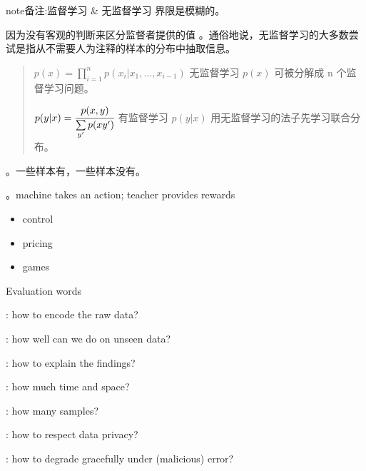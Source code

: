 \documentclass[letterpaper,10pt,english]{sphinxmanual}
\begin{document}
\begin{sphinxadmonition}{note}{备注:}{监督学习 \& 无监督学习 界限是模糊的。}

\sphinxAtStartPar
因为没有客观的判断来区分监督者提供的值 。通俗地说，无监督学习的大多数尝试是指从不需要人为注释的样本的分布中抽取信息。
\begin{quote}

\begin{DUlineblock}{0em}
\item[] \(p(x)=\prod\limits_{i=1}^np(x_i|x_1,\dots,x_{i-1})\) 无监督学习 \(p(x)\) 可被分解成 n 个监督学习问题。
\item[] \(p(y|x)=\cfrac{p(x,y)}{\sum\limits_{y'}p(xy')}\) 有监督学习 \(p(y|x)\) 用无监督学习的法子先学习联合分布。
\end{DUlineblock}
\end{quote}
\end{sphinxadmonition}

\begin{DUlineblock}{0em}
\item[]  。一些样本有，一些样本没有。
\item[]  。machine takes an action; teacher provides rewards
\end{DUlineblock}
\begin{itemize}
\item {} 
\sphinxAtStartPar
control

\item {} 
\sphinxAtStartPar
pricing

\item {} 
\sphinxAtStartPar
games

\end{itemize}

\noindent{}

\begin{DUlineblock}{0em}
\item[] 
\end{DUlineblock}

\begin{DUlineblock}{0em}
\item[] Evaluation  words
\item[] : how to encode the raw data?
\item[] : how well can we do on unseen data?
\item[] : how to explain the findings?
\item[] : how much time and space?
\item[] : how many samples?
\item[] : how to respect data privacy?
\item[] : how to degrade gracefully under (malicious) error?
\end{DUlineblock}
\end{document}
